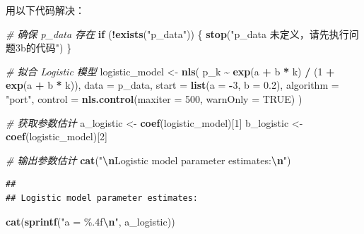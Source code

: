 \documentclass[
]{article}
\newenvironment{Shaded}{\begin{snugshade}}{\end{snugshade}}
\newcommand{\AttributeTok}[1]{\textcolor[rgb]{0.13,0.29,0.53}{#1}}
\newcommand{\CommentTok}[1]{\textcolor[rgb]{0.56,0.35,0.01}{\textit{#1}}}
\newcommand{\ConstantTok}[1]{\textcolor[rgb]{0.56,0.35,0.01}{#1}}
\newcommand{\ControlFlowTok}[1]{\textcolor[rgb]{0.13,0.29,0.53}{\textbf{#1}}}
\newcommand{\DecValTok}[1]{\textcolor[rgb]{0.00,0.00,0.81}{#1}}
\newcommand{\FloatTok}[1]{\textcolor[rgb]{0.00,0.00,0.81}{#1}}
\newcommand{\FunctionTok}[1]{\textcolor[rgb]{0.13,0.29,0.53}{\textbf{#1}}}
\newcommand{\NormalTok}[1]{#1}
\newcommand{\OtherTok}[1]{\textcolor[rgb]{0.56,0.35,0.01}{#1}}
\newcommand{\SpecialCharTok}[1]{\textcolor[rgb]{0.81,0.36,0.00}{\textbf{#1}}}
\newcommand{\StringTok}[1]{\textcolor[rgb]{0.31,0.60,0.02}{#1}}
\begin{document}
用以下代码解决：

\begin{Shaded}
\begin{Highlighting}[]
\CommentTok{\# 确保 p\_data 存在}
\ControlFlowTok{if}\NormalTok{ (}\SpecialCharTok{!}\FunctionTok{exists}\NormalTok{(}\StringTok{"p\_data"}\NormalTok{)) \{}
  \FunctionTok{stop}\NormalTok{(}\StringTok{"p\_data 未定义，请先执行问题3b的代码"}\NormalTok{)}
\NormalTok{\}}

\CommentTok{\# 拟合 Logistic 模型}
\NormalTok{logistic\_model }\OtherTok{\textless{}{-}} \FunctionTok{nls}\NormalTok{(}
\NormalTok{  p\_k }\SpecialCharTok{\textasciitilde{}} \FunctionTok{exp}\NormalTok{(a }\SpecialCharTok{+}\NormalTok{ b }\SpecialCharTok{*}\NormalTok{ k) }\SpecialCharTok{/}\NormalTok{ (}\DecValTok{1} \SpecialCharTok{+} \FunctionTok{exp}\NormalTok{(a }\SpecialCharTok{+}\NormalTok{ b }\SpecialCharTok{*}\NormalTok{ k)),}
  \AttributeTok{data =}\NormalTok{ p\_data,}
  \AttributeTok{start =} \FunctionTok{list}\NormalTok{(}\AttributeTok{a =} \SpecialCharTok{{-}}\DecValTok{3}\NormalTok{, }\AttributeTok{b =} \FloatTok{0.2}\NormalTok{),}
  \AttributeTok{algorithm =} \StringTok{"port"}\NormalTok{,}
  \AttributeTok{control =} \FunctionTok{nls.control}\NormalTok{(}\AttributeTok{maxiter =} \DecValTok{500}\NormalTok{, }\AttributeTok{warnOnly =} \ConstantTok{TRUE}\NormalTok{)}
\NormalTok{)}

\CommentTok{\# 获取参数估计}
\NormalTok{a\_logistic }\OtherTok{\textless{}{-}} \FunctionTok{coef}\NormalTok{(logistic\_model)[}\DecValTok{1}\NormalTok{]}
\NormalTok{b\_logistic }\OtherTok{\textless{}{-}} \FunctionTok{coef}\NormalTok{(logistic\_model)[}\DecValTok{2}\NormalTok{]}

\CommentTok{\# 输出参数估计}
\FunctionTok{cat}\NormalTok{(}\StringTok{"}\SpecialCharTok{\textbackslash{}n}\StringTok{Logistic model parameter estimates:}\SpecialCharTok{\textbackslash{}n}\StringTok{"}\NormalTok{)}
\end{Highlighting}
\end{Shaded}

\begin{verbatim}
## 
## Logistic model parameter estimates:
\end{verbatim}

\begin{Shaded}
\begin{Highlighting}[]
\FunctionTok{cat}\NormalTok{(}\FunctionTok{sprintf}\NormalTok{(}\StringTok{"a = \%.4f}\SpecialCharTok{\textbackslash{}n}\StringTok{"}\NormalTok{, a\_logistic))}
\end{Highlighting}
\end{Shaded}
\end{document}
